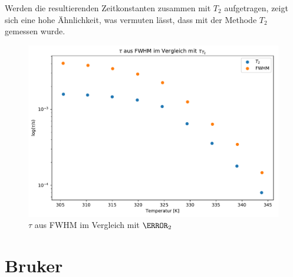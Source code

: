 Werden die resultierenden Zeitkonstanten zusammen mit $T_2$ aufgetragen, zeigt sich eine hohe Ähnlichkeit, was vermuten lässt, dass mit der Methode $T_2$ gemessen wurde.
\begin{figure}
	\begin{center}
		\includegraphics[width=\textwidth]{graphics/plots/SPEKDYN/spekdyn_t2.pdf}
	\end{center}
	\caption{$\tau$ aus FWHM im Vergleich mit $\T_2$} \label{fig:res:spekdyn_t2}
\end{figure}



\section{Bruker} \label{section:res:bruker}

